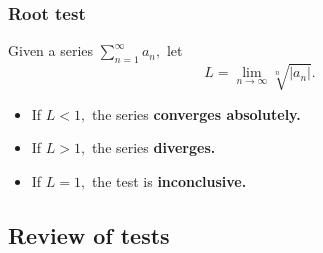 \documentclass[letterpaper, 12pt]{article}
\begin{document}
\subsubsection*{Root test}

Given a series $\displaystyle \sum_{n=1}^\infty a_n,$ let
$$L = \lim_{n \to \infty} \sqrt[n]{|a_n|}.$$
\begin{itemize}
    \item If $L < 1,$ the series \textbf{converges absolutely.}
    \item If $L > 1,$ the series \textbf{diverges.}
    \item If $L = 1,$ the test is \textbf{inconclusive.}
\end{itemize}

\newpage 

\subsection*{Review of tests}
\end{document}
